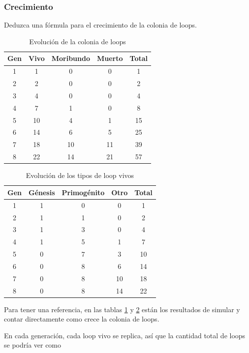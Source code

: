 \documentclass{article}
\begin{document}
\subsubsection{Crecimiento}

Deduzca una fórmula para el crecimiento de la colonia de loops.

\begin{table}
  \centering
  \begin{tabular}{| c | c | c | c | c |}
    \hline
    Gen & Vivo & Moribundo & Muerto & Total\\
    \hline
    1 & 1 & 0 & 0 & 1\\
    2 & 2 & 0 & 0 & 2\\
    3 & 4 & 0 & 0 & 4\\
    4 & 7 & 1 & 0 & 8\\
    5 & 10 & 4 & 1 & 15\\
    6 & 14 & 6 & 5 & 25\\
    7 & 18 & 10 & 11 & 39\\
    8 & 22 & 14 & 21 & 57\\
    \hline
  \end{tabular}
  \caption{Evolución de la colonia de loops}
  \label{tab:langton-evol}
\end{table}

\begin{table}
  \centering
  \begin{tabular}{| c | c | c | c | c |}
    \hline
    Gen & Génesis & Primogénito & Otro & Total\\
    \hline
    1 & 1 & 0 & 0 & 1\\
    2 & 1 & 1 & 0 & 2\\
    3 & 1 & 3 & 0 & 4\\
    4 & 1 & 5 & 1 & 7\\
    5 & 0 & 7 & 3 & 10\\
    6 & 0 & 8 & 6 & 14\\
    7 & 0 & 8 & 10 & 18\\
    8 & 0 & 8 & 14 & 22\\
    \hline
  \end{tabular}
  \caption{Evolución de los tipos de loop vivos}
  \label{tab:langton-alive}
\end{table}

Para tener una referencia, en las tablas \ref{tab:langton-evol} y
\ref{tab:langton-alive} están los resultados de simular y contar directamente
como crece la colonia de loops.

En cada generación, cada loop vivo se replica, así que la cantidad total de
loops se podría ver como
\end{document}
